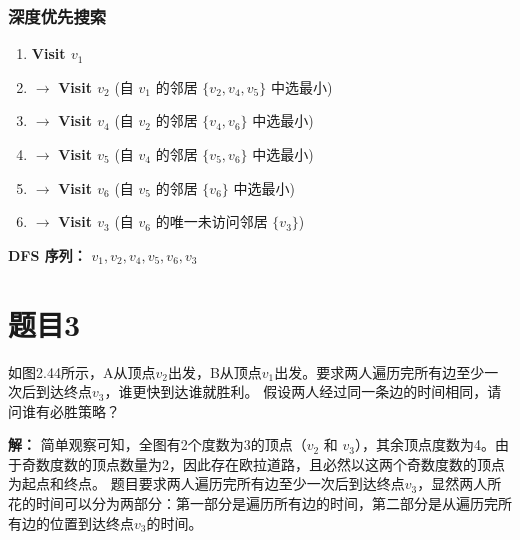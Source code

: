 \documentclass[utf8]{ctexart}
\theoremstyle{mystyle}
\begin{document}
\subsubsection*{深度优先搜索}
\begin{enumerate}
    \item \textbf{Visit $v_1$}
    \item $\to$ \textbf{Visit $v_2$} (自 $v_1$ 的邻居 $\{v_2, v_4, v_5\}$ 中选最小)
    \item $\to$ \textbf{Visit $v_4$} (自 $v_2$ 的邻居 $\{v_4, v_6\}$ 中选最小)
    \item $\to$ \textbf{Visit $v_5$} (自 $v_4$ 的邻居 $\{v_5, v_6\}$ 中选最小)
    \item $\to$ \textbf{Visit $v_6$} (自 $v_5$ 的邻居 $\{v_6\}$ 中选最小)
    \item $\to$ \textbf{Visit $v_3$} (自 $v_6$ 的唯一未访问邻居 $\{v_3\}$)
\end{enumerate}
\textbf{DFS 序列：} $v_1, v_2, v_4, v_5, v_6, v_3$

\newpage
\section*{题目3}
\begin{problembox}
    如图2.44所示，A从顶点$v_2$出发，B从顶点$v_1$出发。要求两人遍历完所有边至少一次后到达终点$v_3$，谁更快到达谁就胜利。
    假设两人经过同一条边的时间相同，请问谁有必胜策略？
\end{problembox}
\begin{center}
\end{center}
\textbf{解：} 简单观察可知，全图有2个度数为3的顶点（$v_2$ 和 $v_3$），其余顶点度数为4。由于奇数度数的顶点数量为2，因此存在欧拉道路，且必然以这两个奇数度数的顶点为起点和终点。
题目要求两人遍历完所有边至少一次后到达终点$v_3$，显然两人所花的时间可以分为两部分：第一部分是遍历所有边的时间，第二部分是从遍历完所有边的位置到达终点$v_3$的时间。
\end{document}
